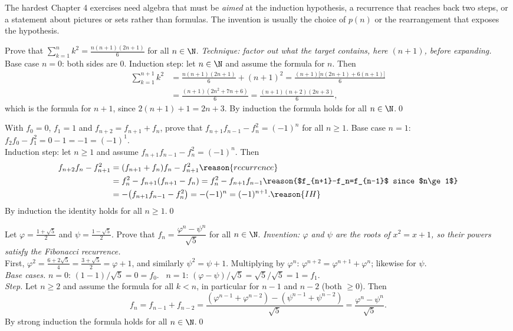 The hardest Chapter 4 exercises need algebra that must be \emph{aimed} at the induction hypothesis, a recurrence that reaches back two steps, or a statement about pictures or sets rather than formulas. The invention is usually the choice of $p(n)$ or the rearrangement that exposes the hypothesis.

\begin{bexample}
Prove that $\displaystyle\sum_{k=1}^nk^2=\frac{n(n+1)(2n+1)}6$ for all $n\in\N$.
\solution
\emph{Technique: factor out what the target contains, here $(n+1)$, before expanding.}\\
Base case $n=0$: both sides are $0$. Induction step: let $n\in\N$ and assume the formula for $n$. Then
\begin{align*}
\sum_{k=1}^{n+1}k^2&=\frac{n(n+1)(2n+1)}6+(n+1)^2=\frac{(n+1)\big[n(2n+1)+6(n+1)\big]}6\\
&=\frac{(n+1)(2n^2+7n+6)}6=\frac{(n+1)(n+2)(2n+3)}6,
\end{align*}
which is the formula for $n+1$, since $2(n+1)+1=2n+3$. By induction the formula holds for all $n\in\N$.\qed
\end{bexample}

\begin{bexample}
With $f_0=0$, $f_1=1$ and $f_{n+2}=f_{n+1}+f_n$, prove that $f_{n+1}f_{n-1}-f_n^2=(-1)^n$ for all $n\ge1$.
\solution
Base case $n=1$: $f_2f_0-f_1^2=0-1=-1=(-1)^1$.\\
Induction step: let $n\ge1$ and assume $f_{n+1}f_{n-1}-f_n^2=(-1)^n$. Then
\begin{align*}
f_{n+2}f_n-f_{n+1}^2&=(f_{n+1}+f_n)f_n-f_{n+1}^2\reason{recurrence}\\
&=f_n^2-f_{n+1}(f_{n+1}-f_n)=f_n^2-f_{n+1}f_{n-1}\reason{$f_{n+1}-f_n=f_{n-1}$ since $n\ge1$}\\
&=-\big(f_{n+1}f_{n-1}-f_n^2\big)=-(-1)^n=(-1)^{n+1}.\reason{IH}
\end{align*}
By induction the identity holds for all $n\ge1$.\qed
\end{bexample}

\begin{bexample}
Let $\varphi=\frac{1+\sqrt5}2$ and $\psi=\frac{1-\sqrt5}2$. Prove that $f_n=\dfrac{\varphi^n-\psi^n}{\sqrt5}$ for all $n\in\N$.
\solution
\emph{Invention: $\varphi$ and $\psi$ are the roots of $x^2=x+1$, so their powers satisfy the Fibonacci recurrence.}\\
First, $\varphi^2=\frac{6+2\sqrt5}4=\frac{3+\sqrt5}2=\varphi+1$, and similarly $\psi^2=\psi+1$. Multiplying by $\varphi^n$: $\varphi^{n+2}=\varphi^{n+1}+\varphi^n$; likewise for $\psi$.\\
\emph{Base cases.} $n=0$: $(1-1)/\sqrt5=0=f_0$. \ $n=1$: $(\varphi-\psi)/\sqrt5=\sqrt5/\sqrt5=1=f_1$.\\
\emph{Step.} Let $n\ge2$ and assume the formula for all $k<n$, in particular for $n-1$ and $n-2$ (both $\ge0$). Then
\[
f_n=f_{n-1}+f_{n-2}=\frac{(\varphi^{n-1}+\varphi^{n-2})-(\psi^{n-1}+\psi^{n-2})}{\sqrt5}=\frac{\varphi^n-\psi^n}{\sqrt5}.
\]
By strong induction the formula holds for all $n\in\N$.\qed
\end{bexample}

